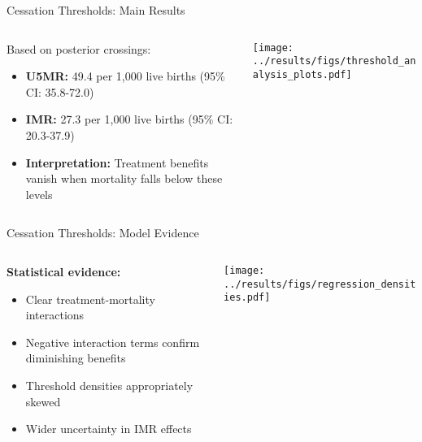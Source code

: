 \documentclass[aspectratio=169]{beamer}\usepackage[]{graphicx}\usepackage[dvipsnames]{xcolor}
\begin{document}
\begin{frame}{Cessation Thresholds: Main Results}
\begin{columns}
\begin{column}{0.35\textwidth}

Based on posterior crossings:
\begin{itemize}
\item \textbf{U5MR:} 49.4 per 1,000 live births (95\% CI: 35.8-72.0)
\item \textbf{IMR:} 27.3 per 1,000 live births (95\% CI: 20.3-37.9)
\item \textbf{Interpretation:} Treatment benefits vanish when mortality falls below these levels
\end{itemize}
\end{column}
\begin{column}{0.65\textwidth}
\begin{center}
\texttt{[image: ../results/figs/threshold\_analysis\_plots.pdf]}
\end{center}
\end{column}
\end{columns}
\end{frame}

\begin{frame}{Cessation Thresholds: Model Evidence}
\begin{columns}
\begin{column}{0.35\textwidth}
\textbf{Statistical evidence:}
\begin{itemize}
  \item Clear treatment-mortality interactions
  \item Negative interaction terms confirm diminishing benefits
  \item Threshold densities appropriately skewed
  \item Wider uncertainty in IMR effects
\end{itemize}
\end{column}
\begin{column}{0.6\textwidth}
\begin{center}
\texttt{[image: ../results/figs/regression\_densities.pdf]}
\end{center}
\end{column}
\end{columns}
\end{frame}
\end{document}
